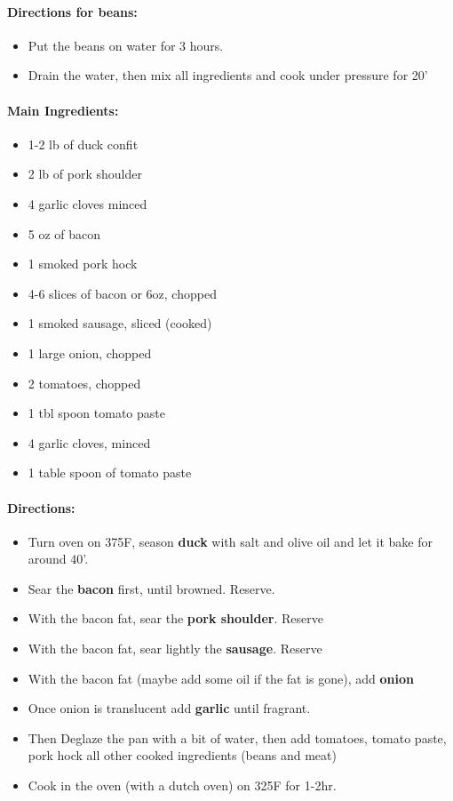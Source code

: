 \documentclass{article}
\begin{document}
\paragraph{Directions for beans:}
\begin{itemize}
	\item Put the beans on water for 3 hours.
	\item Drain the water, then mix all ingredients and cook under pressure for 20'
\end{itemize}

\paragraph{Main Ingredients:}
\begin{itemize}
	\item 1-2 lb of duck confit	
	\item 2 lb of pork shoulder
	\item 4 garlic cloves minced
	\item 5 oz of bacon
	\item 1 smoked pork hock
	\item 4-6 slices of bacon or 6oz, chopped
	\item 1 smoked sausage, sliced (cooked)
	\item 1 large onion, chopped
	\item 2 tomatoes, chopped
	\item 1 tbl spoon tomato paste
	\item 4 garlic cloves, minced
	\item 1 table spoon of tomato paste
\end{itemize}

\paragraph{Directions:}
\begin{itemize}
	\item Turn oven on 375F, season \textbf{duck} with salt and olive oil and let it bake for around 40'.
	\item Sear the \textbf{bacon} first, until browned. Reserve.
	\item With the bacon fat, sear the \textbf{pork shoulder}. Reserve
	\item With the bacon fat, sear lightly the \textbf{sausage}. Reserve
	\item With the bacon fat (maybe add some oil if the fat is gone), add \textbf{onion}
	\item Once onion is translucent add \textbf{garlic} until fragrant.
	\item Then Deglaze the pan with a bit of water, then add tomatoes, tomato paste, pork hock all other cooked ingredients (beans and meat)
	\item Cook in the oven (with a dutch oven) on 325F for 1-2hr.
\end{itemize}
\end{document}
